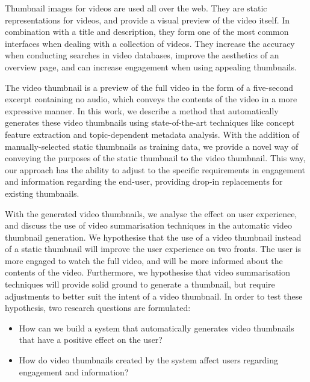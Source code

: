 \documentclass{../resources/sig-alternate-05-2015}
\begin{document}

Thumbnail images for videos are used all over the web. They are static representations for videos, and provide a visual preview of the video itself. In combination with a title and description, they form one of the most common interfaces when dealing with a collection of videos. They increase the accuracy when conducting searches in video databases, improve the aesthetics of an overview page, and can increase engagement when using appealing thumbnails.

The video thumbnail is a preview of the full video in the form of a five-second excerpt containing no audio, which conveys the contents of the video in a more expressive manner. In this work, we describe a method that automatically generates these video thumbnails using state-of-the-art techniques like concept feature extraction and topic-dependent metadata analysis. With the addition of manually-selected static thumbnails as training data, we provide a novel way of conveying the purposes of the static thumbnail to the video thumbnail. This way, our approach has the ability to adjust to the specific requirements in engagement and information regarding the end-user, providing drop-in replacements for existing thumbnails.

With the generated video thumbnails, we analyse the effect on user experience, and discuss the use of video summarisation techniques in the automatic video thumbnail generation. We hypothesise that the use of a video thumbnail instead of a static thumbnail will improve the user experience on two fronts. The user is more engaged to watch the full video, and will be more informed about the contents of the video. Furthermore, we hypothesise that video summarisation techniques will provide solid ground to generate a thumbnail, but require adjustments to better suit the intent of a video thumbnail. In order to test these hypothesis, two research questions are formulated:

\begin{itemize}
	\item How can we build a system that automatically generates video thumbnails that have a positive effect on the user?
	\item How do video thumbnails created by the system affect users regarding engagement and information?
\end{itemize}
\end{document}
